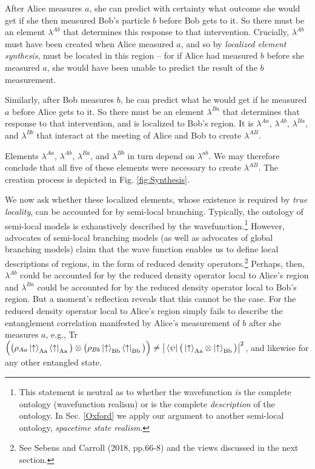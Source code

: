 \documentclass[a4paper]{article}
\begin{document}
After Alice measures $a$, she can predict with certainty what outcome she would get if she then measured Bob's particle $b$ before Bob gets to it. 
So there must be an element $\lambda^{Ab}$ that determines this response to that intervention. Crucially, $\lambda^{Ab}$ must have been created when Alice measured $a$, and so by \textit{localized element synthesis}, must be located in this region -- for if Alice had measured $b$ before she measured $a$, she would have been unable to predict the result of the $b$ measurement.  

Similarly, after Bob measures $b$, he can predict what he would get if he measured $a$ before Alice gets to it.  So there must be an element $\lambda^{Ba}$ that determines that response to that intervention, and is localized to Bob's region. It is $\lambda^{Aa}$, $\lambda^{Ab}$, $\lambda^{Ba}$, and $\lambda^{Bb}$ that interact at the meeting of Alice and Bob to create $\lambda^{AB}$. 

Elements $\lambda^{Aa}$, $\lambda^{Ab}$, $\lambda^{Ba}$, and $\lambda^{Bb}$ in turn depend on $\lambda^{ab}$. We may therefore conclude that all five of these elements were necessary to create $\lambda^{AB}$. The creation process is depicted in Fig. \ref{fig:Synthesis}.

We now ask whether these localized elements, whose existence is required by \textit{true locality}, can be accounted for by semi-local branching. Typically, the ontology of semi-local models is exhaustively described by the wavefunction.\footnote{This statement is neutral as to whether the wavefunction \textit{is} the complete ontology (wavefunction realism) or is the complete \textit{description} of the ontology. In Sec. \ref{Oxford} we apply our argument to another semi-local ontology,  \textit{spacetime state realism}.} However, advocates of semi-local branching models (as well as advocates of global branching models) claim that the wave function enables us to define local descriptions of regions, in the form of reduced density operators.\footnote{See Sebens and Carroll (2018, pp.66-8) and the views discussed in the next section.} Perhaps, then, $\lambda^{Ab}$ could be accounted for by the reduced density operator local to Alice's region and $\lambda^{Ba}$ could be accounted for by the reduced density operator local to Bob's region. But a moment's reflection reveals that this cannot be the case. For the reduced density operator local to Alice's region simply fails to describe the entanglement correlation manifested by Alice's measurement of $b$ after she measures $a$, e.g., Tr$\Big(\big(\rho_{Aa} \Ket{\uparrow}_{\rm Aa}\Bra{\uparrow}_{\rm Aa}\big) \otimes  \big(\rho_{Bb}\Ket{\uparrow}_{\rm Bb}\Bra{\uparrow}_{\rm Bb}\big)\Big) \neq \big|\Bra{\psi}\big(\Ket{\uparrow}_{\rm Aa} \otimes \Ket{\uparrow}_{\rm Bb}\big)\big|^2$, and likewise for any other entangled state.
\end{document}
